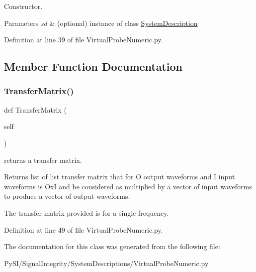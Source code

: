 Constructor. 


\begin{DoxyParams}{Parameters}
{\em sd} & (optional) instance of class \hyperlink{namespaceSignalIntegrity_1_1SystemDescriptions_1_1SystemDescription}{System\+Description} \\
\hline
\end{DoxyParams}


Definition at line 39 of file Virtual\+Probe\+Numeric.\+py.



\subsection{Member Function Documentation}
\mbox{\label{classSignalIntegrity_1_1SystemDescriptions_1_1VirtualProbeNumeric_1_1VirtualProbeNumeric_aecf838369a0d4e9037ba351539bd8eb1}} 
\subsubsection{\texorpdfstring{Transfer\+Matrix()}{TransferMatrix()}}
{\footnotesize\ttfamily def Transfer\+Matrix (\begin{DoxyParamCaption}\item[{}]{self }\end{DoxyParamCaption})}



returns a transfer matrix. 

\begin{DoxyReturn}{Returns}
list of list transfer matrix that for O output waveforms and I input waveforms is OxI and be considered as multiplied by a vector of input waveforms to produce a vector of output waveforms.
\end{DoxyReturn}
The transfer matrix provided is for a single frequency. 

Definition at line 49 of file Virtual\+Probe\+Numeric.\+py.



The documentation for this class was generated from the following file\+:\begin{DoxyCompactItemize}
\item 
Py\+S\+I/\+Signal\+Integrity/\+System\+Descriptions/Virtual\+Probe\+Numeric.\+py\end{DoxyCompactItemize}
